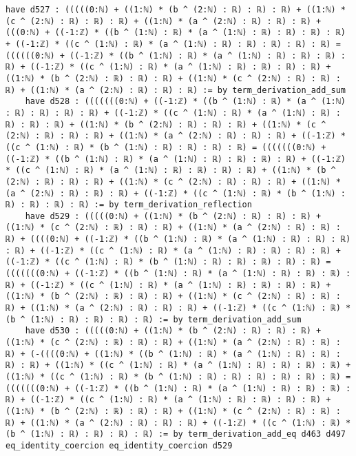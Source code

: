 \documentclass{article}
\begin{document}
\begin{tcolorbox}[colback=white!10, width=\linewidth]
\begin{lstlisting}[language=Lean4]
    have d527 : (((((0:ℕ) + ((1:ℕ) * (b ^ (2:ℕ) : ℝ) : ℝ) : ℝ) + ((1:ℕ) * (c ^ (2:ℕ) : ℝ) : ℝ) : ℝ) + ((1:ℕ) * (a ^ (2:ℕ) : ℝ) : ℝ) : ℝ) + (((0:ℕ) + ((-1:ℤ) * ((b ^ (1:ℕ) : ℝ) * (a ^ (1:ℕ) : ℝ) : ℝ) : ℝ) : ℝ) + ((-1:ℤ) * ((c ^ (1:ℕ) : ℝ) * (a ^ (1:ℕ) : ℝ) : ℝ) : ℝ) : ℝ) : ℝ) = ((((((0:ℕ) + ((-1:ℤ) * ((b ^ (1:ℕ) : ℝ) * (a ^ (1:ℕ) : ℝ) : ℝ) : ℝ) : ℝ) + ((-1:ℤ) * ((c ^ (1:ℕ) : ℝ) * (a ^ (1:ℕ) : ℝ) : ℝ) : ℝ) : ℝ) + ((1:ℕ) * (b ^ (2:ℕ) : ℝ) : ℝ) : ℝ) + ((1:ℕ) * (c ^ (2:ℕ) : ℝ) : ℝ) : ℝ) + ((1:ℕ) * (a ^ (2:ℕ) : ℝ) : ℝ) : ℝ) := by term_derivation_add_sum
    have d528 : (((((((0:ℕ) + ((-1:ℤ) * ((b ^ (1:ℕ) : ℝ) * (a ^ (1:ℕ) : ℝ) : ℝ) : ℝ) : ℝ) + ((-1:ℤ) * ((c ^ (1:ℕ) : ℝ) * (a ^ (1:ℕ) : ℝ) : ℝ) : ℝ) : ℝ) + ((1:ℕ) * (b ^ (2:ℕ) : ℝ) : ℝ) : ℝ) + ((1:ℕ) * (c ^ (2:ℕ) : ℝ) : ℝ) : ℝ) + ((1:ℕ) * (a ^ (2:ℕ) : ℝ) : ℝ) : ℝ) + ((-1:ℤ) * ((c ^ (1:ℕ) : ℝ) * (b ^ (1:ℕ) : ℝ) : ℝ) : ℝ) : ℝ) = (((((((0:ℕ) + ((-1:ℤ) * ((b ^ (1:ℕ) : ℝ) * (a ^ (1:ℕ) : ℝ) : ℝ) : ℝ) : ℝ) + ((-1:ℤ) * ((c ^ (1:ℕ) : ℝ) * (a ^ (1:ℕ) : ℝ) : ℝ) : ℝ) : ℝ) + ((1:ℕ) * (b ^ (2:ℕ) : ℝ) : ℝ) : ℝ) + ((1:ℕ) * (c ^ (2:ℕ) : ℝ) : ℝ) : ℝ) + ((1:ℕ) * (a ^ (2:ℕ) : ℝ) : ℝ) : ℝ) + ((-1:ℤ) * ((c ^ (1:ℕ) : ℝ) * (b ^ (1:ℕ) : ℝ) : ℝ) : ℝ) : ℝ) := by term_derivation_reflection
    have d529 : (((((0:ℕ) + ((1:ℕ) * (b ^ (2:ℕ) : ℝ) : ℝ) : ℝ) + ((1:ℕ) * (c ^ (2:ℕ) : ℝ) : ℝ) : ℝ) + ((1:ℕ) * (a ^ (2:ℕ) : ℝ) : ℝ) : ℝ) + ((((0:ℕ) + ((-1:ℤ) * ((b ^ (1:ℕ) : ℝ) * (a ^ (1:ℕ) : ℝ) : ℝ) : ℝ) : ℝ) + ((-1:ℤ) * ((c ^ (1:ℕ) : ℝ) * (a ^ (1:ℕ) : ℝ) : ℝ) : ℝ) : ℝ) + ((-1:ℤ) * ((c ^ (1:ℕ) : ℝ) * (b ^ (1:ℕ) : ℝ) : ℝ) : ℝ) : ℝ) : ℝ) = (((((((0:ℕ) + ((-1:ℤ) * ((b ^ (1:ℕ) : ℝ) * (a ^ (1:ℕ) : ℝ) : ℝ) : ℝ) : ℝ) + ((-1:ℤ) * ((c ^ (1:ℕ) : ℝ) * (a ^ (1:ℕ) : ℝ) : ℝ) : ℝ) : ℝ) + ((1:ℕ) * (b ^ (2:ℕ) : ℝ) : ℝ) : ℝ) + ((1:ℕ) * (c ^ (2:ℕ) : ℝ) : ℝ) : ℝ) + ((1:ℕ) * (a ^ (2:ℕ) : ℝ) : ℝ) : ℝ) + ((-1:ℤ) * ((c ^ (1:ℕ) : ℝ) * (b ^ (1:ℕ) : ℝ) : ℝ) : ℝ) : ℝ) := by term_derivation_add_sum
    have d530 : (((((0:ℕ) + ((1:ℕ) * (b ^ (2:ℕ) : ℝ) : ℝ) : ℝ) + ((1:ℕ) * (c ^ (2:ℕ) : ℝ) : ℝ) : ℝ) + ((1:ℕ) * (a ^ (2:ℕ) : ℝ) : ℝ) : ℝ) + (-((((0:ℕ) + ((1:ℕ) * ((b ^ (1:ℕ) : ℝ) * (a ^ (1:ℕ) : ℝ) : ℝ) : ℝ) : ℝ) + ((1:ℕ) * ((c ^ (1:ℕ) : ℝ) * (a ^ (1:ℕ) : ℝ) : ℝ) : ℝ) : ℝ) + ((1:ℕ) * ((c ^ (1:ℕ) : ℝ) * (b ^ (1:ℕ) : ℝ) : ℝ) : ℝ) : ℝ) : ℝ) : ℝ) = (((((((0:ℕ) + ((-1:ℤ) * ((b ^ (1:ℕ) : ℝ) * (a ^ (1:ℕ) : ℝ) : ℝ) : ℝ) : ℝ) + ((-1:ℤ) * ((c ^ (1:ℕ) : ℝ) * (a ^ (1:ℕ) : ℝ) : ℝ) : ℝ) : ℝ) + ((1:ℕ) * (b ^ (2:ℕ) : ℝ) : ℝ) : ℝ) + ((1:ℕ) * (c ^ (2:ℕ) : ℝ) : ℝ) : ℝ) + ((1:ℕ) * (a ^ (2:ℕ) : ℝ) : ℝ) : ℝ) + ((-1:ℤ) * ((c ^ (1:ℕ) : ℝ) * (b ^ (1:ℕ) : ℝ) : ℝ) : ℝ) : ℝ) := by term_derivation_add_eq d463 d497 eq_identity_coercion eq_identity_coercion d529

\end{lstlisting}
\end{tcolorbox}
\end{document}
